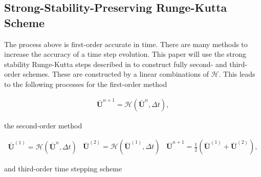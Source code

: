 \documentclass[SingleSpace,12pt]{Serre_ASCE}
\begin{document}
\subsection{Strong-Stability-Preserving Runge-Kutta Scheme} %
The process above is first-order accurate in time. There are many methods to increase the accuracy of a time step evolution. This paper will use the strong stability Runge-Kutta steps described in  to construct fully second- and third-order schemes. These are constructed by a linear combinations of $\mathcal{H}$. This leads to the following processes for the first-order method
\begin{linenomath*}
\begin{gather}\label{eq:SSPRK1}
\boldsymbol{\bar{U}}^{n+1} = \mathcal{H}\left(\boldsymbol{\bar{U}}^{n},\Delta t\right),
\end{gather}
\end{linenomath*}
the second-order method
\begin{linenomath*}
\begin{subequations}
\begin{gather}\label{eq:SSPRK21}
\boldsymbol{\bar{U}}^{\left(1\right)} = \mathcal{H}\left(\boldsymbol{\bar{U}}^{n},\Delta t\right)
\end{gather}
\begin{gather}\label{eq:SSPRK22}
\boldsymbol{\bar{U}}^{\left(2\right)} = \mathcal{H}\left(\boldsymbol{\bar{U}}^{\left(1\right)},\Delta t\right)
\end{gather}
\begin{gather}\label{eq:SSPRK23}
\boldsymbol{\bar{U}}^{n+1} = \frac{1}{2}\left(\boldsymbol{\bar{U}}^{\left(1\right)} + \boldsymbol{\bar{U}}^{\left(2\right)}  \right),
\end{gather}
\end{subequations}
\label{eq:SSPRK2}
\end{linenomath*}
and third-order time stepping scheme
\end{document}
